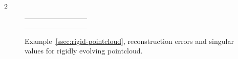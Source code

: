 \documentclass{article}
\newcommand{\R}{\mathbb{R}}                                 %
\begin{document}
\begin{multicols}{2}
\begin{figure}[t]
\begin{tabular}{c c c}
\begin{subfigure}[t]{.24\textwidth}
    \end{subfigure}
    \end{tabular}
    \caption{\small Example~\ref{ssec:rigid-pointcloud}, reconstruction errors and singular values for rigidly evolving pointcloud.}\label{fig:rigidcloud_error_and_svd}
\end{figure}
  





\end{multicols}
\end{document}
